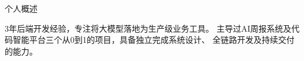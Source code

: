 \documentclass{resume}
\begin{document}

\begin{rSection}{个人概述}

3年后端开发经验，专注将大模型落地为生产级业务工具。
主导过AI周报系统及代码智能平台三个从0到1的项目，具备独立完成系统设计、
全链路开发及持续交付的能力。

\end{rSection}

\end{document}
